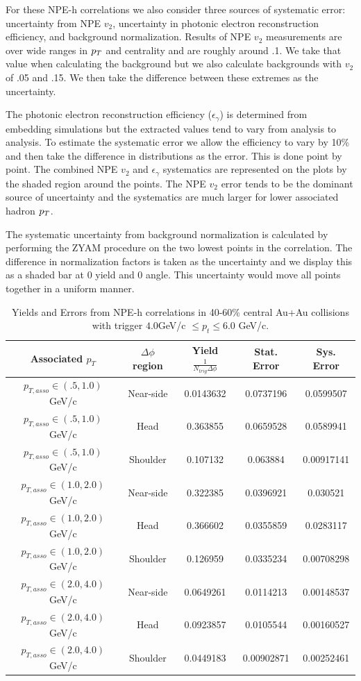 For these NPE-h correlations we also consider three sources of systematic error: uncertainty from NPE $v_2$, uncertainty in photonic electron reconstruction efficiency, and background normalization. Results of NPE $v_2$ measurements are over wide ranges in $p_{T}$ and centrality and are roughly around .1. We take that value when calculating the background but we also calculate backgrounds with $v_2$ of .05 and .15. We then take the difference between these extremes as the uncertainty. 

The photonic electron reconstruction efficiency ($\epsilon_\gamma$) is determined from embedding simulations but the extracted values tend to vary from analysis to analysis. To estimate the systematic error we allow the efficiency to vary by 10\% and then take the difference in distributions as the error. This is done point by point. The combined NPE $v_2$ and $\epsilon_\gamma$ systematics are represented on the plots by the shaded region around the points. The NPE $v_2$ error tends to be the dominant source of uncertainty and the systematics are much larger for lower associated hadron $p_{T}$.

The systematic uncertainty from background normalization is calculated by performing the ZYAM procedure on the two lowest points in the correlation. The difference in normalization factors is taken as the uncertainty and we display this as a shaded bar at 0 yield and 0 angle. This uncertainty would move all points together in a uniform manner.

\begin{table}
\centering
\begin{tabular}{|c|c|c|c|c|}
\hline
Associated $p_T$	& $\Delta\phi$ region & Yield $\frac{1}{N_{trig} \Delta\phi}$ & Stat. Error & Sys. Error\\
\hline
$p_{T,asso} \in(.5, 1.0)$ GeV/c  & Near-side & 0.0143632 & 0.0737196 & 0.0599507 \\
\hline
$p_{T,asso} \in(.5, 1.0)$ GeV/c  & Head & 0.363855 & 0.0659528 & 0.0589941 \\
\hline
$p_{T,asso} \in(.5, 1.0)$ GeV/c  & Shoulder & 0.107132 & 0.063884 & 0.00917141 \\
\hline
$p_{T,asso} \in(1.0, 2.0)$ GeV/c  & Near-side & 0.322385 & 0.0396921 & 0.030521 \\
\hline
$p_{T,asso} \in(1.0, 2.0)$ GeV/c  & Head & 0.366602 & 0.0355859 & 0.0283117 \\
\hline
$p_{T,asso} \in(1.0, 2.0)$ GeV/c  & Shoulder & 0.126959 & 0.0335234 & 0.00708298 \\
\hline
$p_{T,asso} \in(2.0, 4.0)$ GeV/c  & Near-side & 0.0649261 & 0.0114213 & 0.00148537 \\
\hline
$p_{T,asso} \in(2.0, 4.0)$ GeV/c  & Head & 0.0923857 & 0.0105544 & 0.00160527 \\
\hline
$p_{T,asso} \in(2.0, 4.0)$ GeV/c  & Shoulder & 0.0449183 & 0.00902871 & 0.00252461 \\
\hline
\end{tabular}
\caption[Yields and Errors in Au+Au Correlations, 40-60\%, Low Trigger]{Yields and Errors from NPE-h correlations in 40-60\% central Au+Au collisions with trigger $4.0 $GeV/c $\leq p_t \leq 6.0$ GeV/c.}
\label{tab:AuAuYieldPeriLow}
\end{table} 

